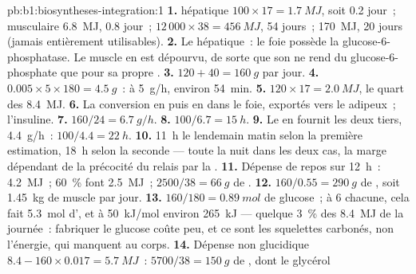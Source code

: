 \begin{solution}{pb:b1:biosyntheses-integration:1}
\textbf{1.}  hépatique $100\times 17 = \qty{1.7}{MJ}$, soit 0.2
jour~;  musculaire \qty{6.8}{MJ}, 0.8 jour~;  $12\,000\times 38 =
\qty{456}{MJ}$, 54 jours~;  \qty{170}{MJ}, 20 jours (jamais
entièrement utilisables).
\textbf{2.} Le  hépatique~: le foie possède la
glucose-6-phosphatase. Le muscle en est dépourvu, de sorte que son
 ne rend du glucose-6-phosphate que pour sa propre .
\textbf{3.} $120 + 40 = \qty{160}{g}$ par jour.
\textbf{4.} $0.005\times 5\times 180 = \qty{4.5}{g}$~: à \qty{5}{g/h}, environ \qty{54}{min}.
\textbf{5.} $120\times 17 = \qty{2.0}{MJ}$, le quart des \qty{8.4}{MJ}.
\textbf{6.} La conversion en  puis en  dans le
foie, exportés vers le  adipeux~; l'insuline.
\textbf{7.} $160/24 = \qty{6.7}{g/h}$.
\textbf{8.} $100/6.7 = \qty{15}{h}$.
\textbf{9.} Le  en fournit les deux tiers, \qty{4.4}{g/h}~: $100/4.4 =
\qty{22}{h}$.
\textbf{10.} 11~h le lendemain matin selon la première estimation, 18~h
selon la seconde --- toute la nuit dans les deux cas, la marge dépendant
de la précocité du relais par la .
\textbf{11.} Dépense de repos sur \qty{12}{h}~: \qty{4.2}{MJ}~;
\qty{60}{\%} font \qty{2.5}{MJ}~; $2500/38 = \qty{66}{g}$ de .
\textbf{12.} $160/0.55 = \qty{290}{g}$ de , soit \qty{1.45}{kg}
de muscle par jour.
\textbf{13.} $160/180 = \qty{0.89}{mol}$ de glucose~; à 6 
chacune, cela fait \qty{5.3}{mol} d', et à \qty{50}{kJ/mol}
environ \qty{265}{kJ} --- quelque \qty{3}{\%} des \qty{8.4}{MJ} de la
journée~: fabriquer le glucose coûte peu, et ce sont les squelettes
carbonés, non l'énergie, qui manquent au corps.
\textbf{14.} Dépense non glucidique $8.4 - 160\times 0.017 =
\qty{5.7}{MJ}$~: $5700/38 = \qty{150}{g}$ de , dont le glycérol

\end{solution}
